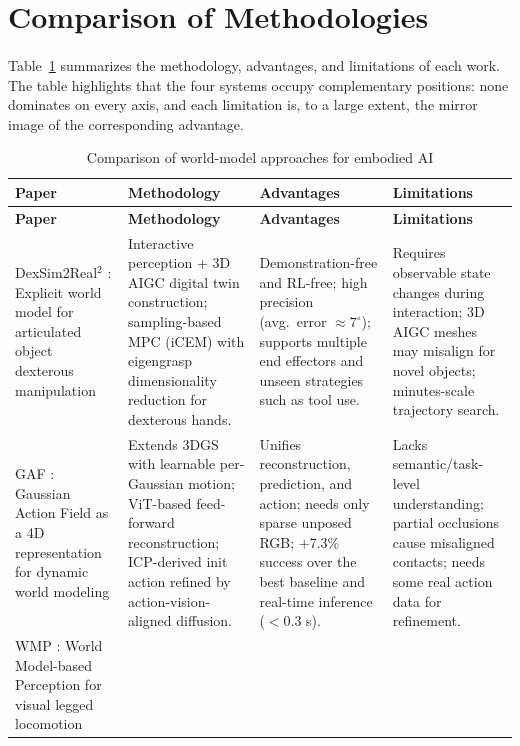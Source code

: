 \documentclass[12pt,a4paper,final]{extreport}
\begin{document}
\section{Comparison of Methodologies}

\paragraph{} Table~\ref{tab:wm_comparison} summarizes the methodology, advantages, and limitations of each work. The table highlights that the four systems occupy complementary positions: none dominates on every axis, and each limitation is, to a large extent, the mirror image of the corresponding advantage.

{\renewcommand{\arraystretch}{1.45}
\setlength{\tabcolsep}{6pt}
\small
\begin{longtable}{|p{3.3cm}|p{3.55cm}|p{3.55cm}|p{3.55cm}|}
\caption{Comparison of world-model approaches for embodied AI}\label{tab:wm_comparison}\\
\hline
\textbf{Paper} & \textbf{Methodology} & \textbf{Advantages} & \textbf{Limitations} \\
\hline
\endfirsthead
\hline
\textbf{Paper} & \textbf{Methodology} & \textbf{Advantages} & \textbf{Limitations} \\
\hline
\endhead
\hline
\endfoot
\hline
\endlastfoot
DexSim2Real$^2$ \cite{p1}: Explicit world model for articulated object dexterous manipulation
 &
Interactive perception + 3D AIGC digital twin construction; sampling-based MPC (iCEM) with eigengrasp dimensionality reduction for dexterous hands. &
Demonstration-free and RL-free; high precision (avg.\ error $\approx 7^{\circ}$); supports multiple end effectors and unseen strategies such as tool use. &
Requires observable state changes during interaction; 3D AIGC meshes may misalign for novel objects; minutes-scale trajectory search. \\
\hline
GAF \cite{p2}: Gaussian Action Field as a 4D representation for dynamic world modeling &
Extends 3DGS with learnable per-Gaussian motion; ViT-based feed-forward reconstruction; ICP-derived init action refined by action-vision-aligned diffusion. &
Unifies reconstruction, prediction, and action; needs only sparse unposed RGB; +7.3\% success over the best baseline and real-time inference ($<$0.3 s). &
Lacks semantic/task-level understanding; partial occlusions cause misaligned contacts; needs some real action data for refinement. \\
\hline
WMP \cite{p3}: World Model-based Perception for visual legged locomotion &

\end{longtable}}
\end{document}
